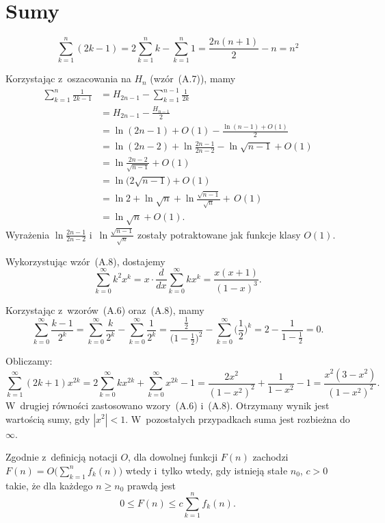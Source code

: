 \chapter{Sumy}


\exercise %
\[
	\sum_{k=1}^n(2k-1) = 2\sum_{k=1}^nk-\sum_{k=1}^n1 = \frac{2n(n+1)}{2}-n = n^2
\]

\exercise %
Korzystając z~oszacowania na $H_n$ (wzór~(A.7)), mamy
\begin{align*}
	\sum_{k=1}^n\frac{1}{2k-1} &= H_{2n-1}-\sum_{k=1}^{n-1}\frac{1}{2k} \\
	&= H_{2n-1}-\frac{H_{n-1}}{2} \\
	&= \ln(2n-1)+O(1)-\frac{\ln(n-1)+O(1)}{2} \\
	&= \ln(2n-2)+\ln\frac{2n-1}{2n-2}-\ln\sqrt{n-1}+O(1) \\
	&= \ln\frac{2n-2}{\sqrt{n-1}}+O(1) \\[1mm]
	&= \ln\bigl(2\sqrt{n-1}\bigr)+O(1) \\
	&= \ln 2+\ln\sqrt{n}+\ln\frac{\sqrt{n-1}}{\sqrt{n}}+\,O(1) \\
	&= \ln\sqrt{n}+O(1).
\end{align*}
Wyrażenia $\ln\frac{2n-1}{2n-2}$ i~$\ln\frac{\sqrt{n-1}}{\sqrt{n}}$ zostały potraktowane jak funkcje klasy $O(1)$.

\exercise %
Wykorzystując wzór~(A.8), dostajemy
\[
	\sum_{k=0}^\infty k^2x^k = x\cdot\frac{d}{dx}\sum_{k=0}^\infty kx^k = \frac{x(x+1)}{(1-x)^3}.
\]

\exercise %
Korzystając z~wzorów~(A.6) oraz~(A.8), mamy
\[
	\sum_{k=0}^\infty\frac{k-1}{2^k} = \sum_{k=0}^\infty\frac{k}{2^k}-\sum_{k=0}^\infty\frac{1}{2^k} = \frac{\frac{1}{2}}{\bigl(1-\frac{1}{2}\bigr)^2}-\sum_{k=0}^\infty\biggl(\frac{1}{2}\biggr)^k = 2-\frac{1}{1-\frac{1}{2}} = 0.
\]

\exercise %
Obliczamy:
\[
	\sum_{k=1}^\infty(2k+1)x^{2k} = 2\sum_{k=0}^\infty kx^{2k}+\sum_{k=0}^\infty x^{2k}-1 = \frac{2x^2}{(1-x^2)^2}+\frac{1}{1-x^2}-1 = \frac{x^2(3-x^2)}{(1-x^2)^2}.
\]
W~drugiej równości zastosowano wzory~(A.6) i~(A.8). Otrzymany wynik jest wartością sumy, gdy $|x^2|<1$. W~pozostałych przypadkach suma jest rozbieżna do $\infty$.

\exercise %
Zgodnie z~definicją notacji $O$, dla dowolnej funkcji $F(n)$ zachodzi $F(n)=O\bigl(\sum_{k=1}^nf_k(n)\bigr)$ wtedy i~tylko wtedy, gdy istnieją stałe $n_0$, $c>0$ takie, że dla każdego $n\ge n_0$ prawdą jest
\[
	0 \le F(n) \le c\sum_{k=1}^n f_k(n).
\]

